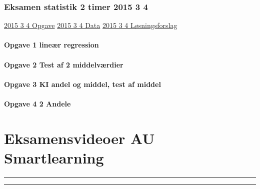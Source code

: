 \documentclass[]{book}
\let\oldparagraph\paragraph
\renewcommand{\paragraph}[1]{\oldparagraph{#1}\mbox{}}
\begin{document}
\hypertarget{eksamen-statistik-2-timer-2015-3-4}{%
\subsubsection{Eksamen statistik 2 timer 2015 3 4}\label{eksamen-statistik-2-timer-2015-3-4}}

\href{https://drive.google.com/file/d/0B1E7VnhxsDMlLVBMek5kWEhRZlU/view?usp=sharing}{2015 3 4 Opgave}
\href{https://drive.google.com/file/d/0B1E7VnhxsDMlX0p3Qk8wWlNxM28/view?usp=sharing}{2015 3 4 Data}
\href{https://drive.google.com/file/d/0B1E7VnhxsDMlWXNWTW55Sk94RDA/view?usp=sharing}{2015 3 4 Løsningsforslag}

\hypertarget{opgave-1-liner-regression-1}{%
\paragraph{Opgave 1 lineær regression}\label{opgave-1-liner-regression-1}}

\hypertarget{opgave-2-test-af-2-middelvrdier}{%
\paragraph{Opgave 2 Test af 2 middelværdier}\label{opgave-2-test-af-2-middelvrdier}}

\hypertarget{opgave-3-ki-andel-og-middel-test-af-middel}{%
\paragraph{Opgave 3 KI andel og middel, test af middel}\label{opgave-3-ki-andel-og-middel-test-af-middel}}

\hypertarget{opgave-4-2-andele}{%
\paragraph{Opgave 4 2 Andele}\label{opgave-4-2-andele}}

\hypertarget{eksamensvideoer-au-smartlearning}{%
\section{Eksamensvideoer AU Smartlearning}\label{eksamensvideoer-au-smartlearning}}

\begin{center}\rule{0.5\linewidth}{\linethickness}\end{center}

\begin{center}\rule{0.5\linewidth}{\linethickness}\end{center}
\end{document}
